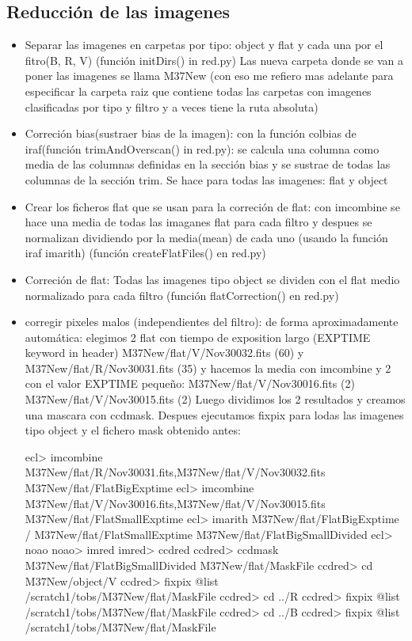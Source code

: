 \documentclass{article}
\begin{document}
\subsection*{Reducción de las imagenes}
\begin{itemize}
\item
Separar las imagenes en carpetas por tipo: object y flat y cada una por el fitro(B, R, V) (función initDirs() in red.py)
Las nueva carpeta donde se van a poner las imagenes se llama M37New (con eso me refiero mas adelante para especificar la carpeta raiz que contiene todas las carpetas con imagenes clasificadas por tipo y filtro y a veces tiene la ruta absoluta)
\item
Correción bias(sustraer bias de la imagen): con la función colbias de iraf(función trimAndOverscan() in red.py): se calcula una columna como media de las columnas definidas en la sección bias y se sustrae de todas las columnas de la sección trim. Se hace para todas las imagenes: flat y object
\item 
Crear los ficheros flat que se usan para la correción de flat:
con imcombine se hace una media de todas las imaganes flat para cada filtro y despues se normalizan dividiendo por la media(mean) de cada uno (usando la función iraf imarith) (función createFlatFiles() en red.py)
\item
Correción de flat:
Todas las imagenes tipo object se dividen con el flat medio normalizado para cada filtro (función flatCorrection() en red.py)

\item corregir pixeles malos (independientes del filtro):
de forma aproximadamente automática: elegimos 2 flat con tiempo de exposition largo (EXPTIME keyword in header)
M37New/flat/V/Nov30032.fits (60) y M37New/flat/R/Nov30031.fits (35) y hacemos la media con imcombine
y 2 con el valor  EXPTIME pequeño: M37New/flat/V/Nov30016.fits (2)  M37New/flat/V/Nov30015.fits (2)
Luego dividimos los 2 resultados y creamos una mascara con ccdmask. Despues ejecutamos fixpix para lodas las imagenes tipo object y el fichero mask obtenido antes:

\begin{verbnobox}[\small]

ecl> imcombine M37New/flat/R/Nov30031.fits,M37New/flat/V/Nov30032.fits M37New/flat/FlatBigExptime
ecl> imcombine M37New/flat/V/Nov30016.fits,M37New/flat/V/Nov30015.fits M37New/flat/FlatSmallExptime
ecl> imarith  M37New/flat/FlatBigExptime /  M37New/flat/FlatSmallExptime  M37New/flat/FlatBigSmallDivided
ecl> noao
noao> imred
imred> ccdred
ccdred> ccdmask  M37New/flat/FlatBigSmallDivided  M37New/flat/MaskFile 
ccdred> cd M37New/object/V
ccdred> fixpix @list /scratch1/tobs/M37New/flat/MaskFile
ccdred> cd ../R
ccdred> fixpix @list /scratch1/tobs/M37New/flat/MaskFile
ccdred> cd ../B
ccdred> fixpix @list /scratch1/tobs/M37New/flat/MaskFile



\end{verbnobox}
\end{itemize}
\end{document}
